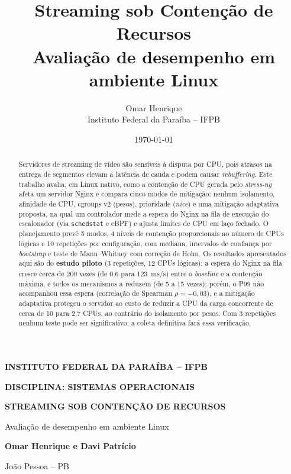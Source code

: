 \documentclass[12pt,a4paper]{article}
\title{
    \textbf{Streaming sob Contenção de Recursos}\\
    \large Avaliação de desempenho em ambiente Linux
}
\author{
    Omar Henrique\\
    Instituto Federal da Paraíba -- IFPB
}
\date{\today}
\begin{document}
\begin{titlepage}
\begin{center}

\textbf{INSTITUTO FEDERAL DA PARAÍBA -- IFPB}

\vspace{1cm}

\textbf{DISCIPLINA: SISTEMAS OPERACIONAIS}

\vfill

{\Large \textbf{STREAMING SOB CONTENÇÃO DE RECURSOS}}

\vspace{0.5cm}

{\large Avaliação de desempenho em ambiente Linux}

\vfill

\textbf{Omar Henrique e Davi Patrício}

\vfill

João Pessoa -- PB

\the\year

\end{center}
\end{titlepage}



\begin{abstract}
\noindent
Servidores de streaming de vídeo são sensíveis à disputa por CPU, pois atrasos na entrega de segmentos
elevam a latência de cauda e podem causar \textit{rebuffering}. Este trabalho avalia, em Linux nativo,
como a contenção de CPU gerada pelo \textit{stress-ng} afeta um servidor Nginx e compara cinco modos de
mitigação: nenhum isolamento, afinidade de CPU, cgroups v2 (pesos), prioridade (\textit{nice}) e uma
mitigação adaptativa proposta, na qual um controlador mede a espera do Nginx na fila de execução do
escalonador (via \texttt{schedstat} e eBPF) e ajusta limites de CPU em laço fechado. O planejamento
prevê 5 modos, 4 níveis de contenção proporcionais ao número de CPUs lógicas e 10 repetições por
configuração, com mediana, intervalos de confiança por \textit{bootstrap} e teste de Mann--Whitney com
correção de Holm. Os resultados apresentados aqui são do \textbf{estudo piloto} (3 repetições, 12 CPUs
lógicas): a espera do Nginx na fila cresce cerca de 200 vezes (de 0,6 para 123~ms/s) entre o
\textit{baseline} e a contenção máxima, e todos os mecanismos a reduzem (de 5 a 15 vezes); porém,
o P99 não acompanhou essa espera (correlação de Spearman $\rho=-0{,}03$), e a mitigação adaptativa
protegeu o servidor ao custo de reduzir a CPU da carga concorrente de cerca de 10 para 2,7 CPUs, ao
contrário do isolamento por pesos. Com 3 repetições nenhum teste pode ser significativo; a coleta
definitiva fará essa verificação.
\end{abstract}
\end{document}
